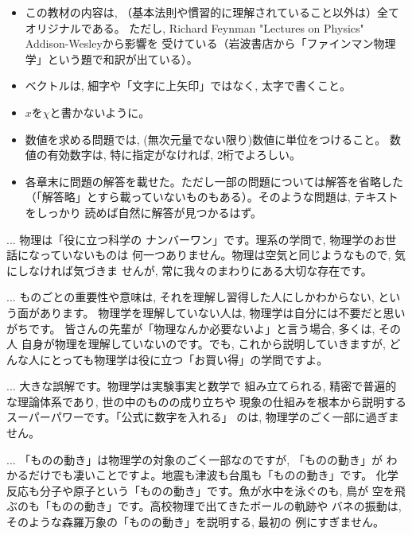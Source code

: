 \begin{itemize}
\item この教材の内容は, （基本法則や慣習的に理解されていること以外は）全てオリジナルである。
ただし, Richard Feynman "Lectures on Physics" Addison-Wesleyから影響を
受けている（岩波書店から「ファインマン物理学」という題で和訳が出ている）。
\item ベクトルは, 細字や「文字に上矢印」ではなく, 太字で書くこと。
\item $x$を$\chi$と書かないように。
\item 数値を求める問題では, (無次元量でない限り)数値に単位をつけること。
数値の有効数字は, 特に指定がなければ, 2桁でよろしい。
\item 各章末に問題の解答を載せた。ただし一部の問題については解答を省略した
（「解答略」とすら載っていないものもある）。そのような問題は, テキストをしっかり
読めば自然に解答が見つかるはず。
\end{itemize}
\mv

\begin{faq}{\small{} ... 物理は「役に立つ科学の
ナンバーワン」です。理系の学問で, 物理学のお世話になっていないものは
何一つありません。物理は空気と同じようなもので, 気にしなければ気づきま
せんが, 常に我々のまわりにある大切な存在です。}\end{faq}

\begin{faq}{\small{} ... ものごとの重要性や意味は, 
それを理解し習得した人にしかわからない, という面があります。
物理学を理解していない人は, 物理学は自分には不要だと思いがちです。
皆さんの先輩が「物理なんか必要ないよ」と言う場合, 多くは, その人
自身が物理を理解していないのです。でも, これから説明していきますが, 
どんな人にとっても物理学は役に立つ「お買い得」の学問ですよ。}\end{faq}

\begin{faq}{\small{} ... 大きな誤解です。物理学は実験事実と数学で
組み立てられる, 精密で普遍的な理論体系であり, 世の中のものの成り立ちや
現象の仕組みを根本から説明するスーパーパワーです。「公式に数字を入れる」
のは, 物理学のごく一部に過ぎません。}\end{faq}

\begin{faq}{\small{}
 ... 「ものの動き」は物理学の対象のごく一部なのですが, 「ものの動き」が
わかるだけでも凄いことですよ。地震も津波も台風も「ものの動き」です。
化学反応も分子や原子という「ものの動き」です。魚が水中を泳ぐのも, 鳥が
空を飛ぶのも「ものの動き」です。高校物理で出てきたボールの軌跡や
バネの振動は, そのような森羅万象の「ものの動き」を説明する, 最初の
例にすぎません。}\end{faq}

